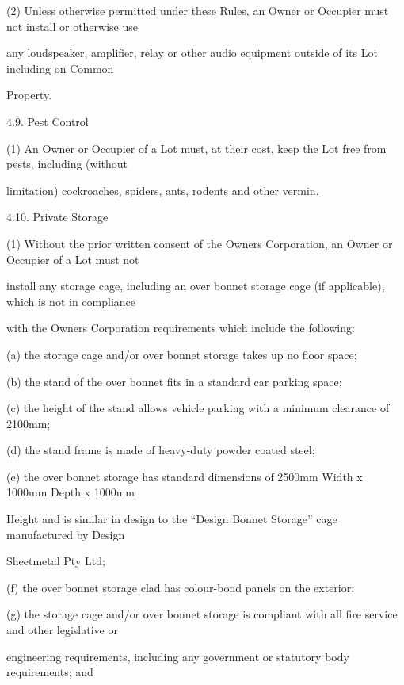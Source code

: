 \documentclass{article}
\begin{document}
{\fontsize{9.962}{1}(2) Unless otherwise permitted under these Rules, an Owner or Occupier must not install or otherwise use }

{\fontsize{10.02}{1}any loudspeaker, amplifier, relay or other audio equipment outside of its Lot including on Common }

{\fontsize{10.02}{1}Property. }

{\fontsize{9.99}{1}4.9. Pest Control }

{\fontsize{9.962}{1}(1) An Owner or Occupier of a Lot must, at their cost, keep the Lot free from pests, including (without }

{\fontsize{10.02}{1}limitation) cockroaches, spiders, ants, rodents and other vermin. }

{\fontsize{9.99}{1}4.10. Private Storage }

{\fontsize{9.962}{1}(1) Without the prior written consent of the Owners Corporation, an Owner or Occupier of a Lot must not }

{\fontsize{10.02}{1}install any storage cage, including an over bonnet storage cage (if applicable), which is not in compliance }

{\fontsize{10.02}{1}with the Owners Corporation requirements which include the following: }

{\fontsize{9.962}{1}(a) the storage cage and/or over bonnet storage takes up no floor space; }

{\fontsize{9.962}{1}(b) the stand of the over bonnet fits in a standard car parking space; }

{\fontsize{9.962}{1}(c) the height of the stand allows vehicle parking with a minimum clearance of 2100mm; }

{\fontsize{9.962}{1}(d) the stand frame is made of heavy-duty powder coated steel; }

{\fontsize{9.962}{1}(e) the over bonnet storage has standard dimensions of 2500mm Width x 1000mm Depth x 1000mm }

{\fontsize{10.02}{1}Height and is similar in design to the “Design Bonnet Storage” cage manufactured by Design }

{\fontsize{10.02}{1}Sheetmetal Pty Ltd; }

{\fontsize{9.962}{1}(f) the over bonnet storage clad has colour-bond panels on the exterior; }


{\fontsize{9.962}{1}(g) the storage cage and/or over bonnet storage is compliant with all fire service and other legislative or }

{\fontsize{10.02}{1}engineering requirements, including any government or statutory body requirements; and }
\end{document}
